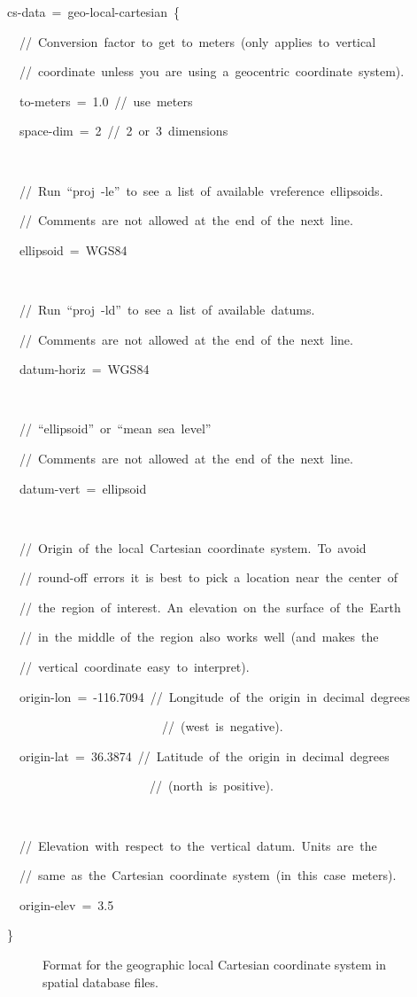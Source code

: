 \begin{lyxcode}
cs-data~=~geo-local-cartesian~\{

~~//~Conversion~factor~to~get~to~meters~(only~applies~to~vertical

~~//~coordinate~unless~you~are~using~a~geocentric~coordinate~system).

~~to-meters~=~1.0~//~use~meters

~~space-dim~=~2~//~2~or~3~dimensions

~

~~//~Run~``proj~-le''~to~see~a~list~of~available~vreference~ellipsoids.

~~//~Comments~are~not~allowed~at~the~end~of~the~next~line.

~~ellipsoid~=~WGS84

~

~~//~Run~``proj~-ld''~to~see~a~list~of~available~datums.

~~//~Comments~are~not~allowed~at~the~end~of~the~next~line.

~~datum-horiz~=~WGS84

~

~~//~``ellipsoid''~or~``mean~sea~level''

~~//~Comments~are~not~allowed~at~the~end~of~the~next~line.

~~datum-vert~=~ellipsoid

~

~~//~Origin~of~the~local~Cartesian~coordinate~system.~To~avoid

~~//~round-off~errors~it~is~best~to~pick~a~location~near~the~center~of

~~//~the~region~of~interest.~An~elevation~on~the~surface~of~the~Earth

~~//~in~the~middle~of~the~region~also~works~well~(and~makes~the

~~//~vertical~coordinate~easy~to~interpret).

~~origin-lon~=~-116.7094~//~Longitude~of~the~origin~in~decimal~degrees

~~~~~~~~~~~~~~~~~~~~~~~~~//~(west~is~negative).

~~origin-lat~=~36.3874~//~Latitude~of~the~origin~in~decimal~degrees~

~~~~~~~~~~~~~~~~~~~~~~~//~(north~is~positive).

~

~~//~Elevation~with~respect~to~the~vertical~datum.~Units~are~the

~~//~same~as~the~Cartesian~coordinate~system~(in~this~case~meters).

~~origin-elev~=~3.5

\}
\end{lyxcode}
\begin{figure}[H]
\caption{Format for the geographic local Cartesian coordinate system in spatial
database files.}
\end{figure}




